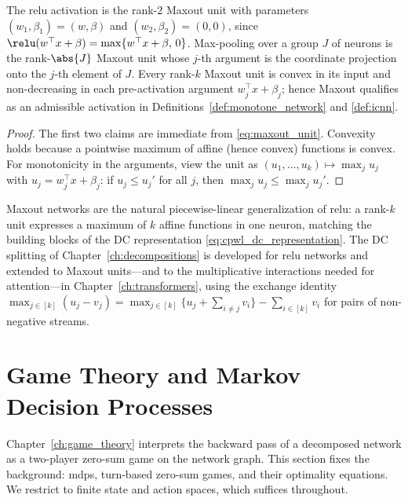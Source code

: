 \begin{observation}\label{obs:relu_maxout_special_case}
The \ac{relu} activation is the rank-$2$ Maxout unit with parameters $(w_1, \beta_1) = (w, \beta)$ and $(w_2, \beta_2) = (0, 0)$, since $\relu(w^\top x + \beta) = \max\{w^\top x + \beta,\, 0\}$. Max-pooling over a group $J$ of neurons is the rank-$\abs{J}$ Maxout unit whose $j$-th argument is the coordinate projection onto the $j$-th element of $J$. Every rank-$k$ Maxout unit is convex in its input and non-decreasing in each pre-activation argument $w_j^\top x + \beta_j$; hence Maxout qualifies as an admissible activation in Definitions~\ref{def:monotone_network} and \ref{def:icnn}.
\hfill{}
\end{observation}

\begin{proof}
The first two claims are immediate from \eqref{eq:maxout_unit}. Convexity holds because a pointwise maximum of affine (hence convex) functions is convex. For monotonicity in the arguments, view the unit as $(u_1, \ldots, u_k) \mapsto \max_j u_j$ with $u_j = w_j^\top x + \beta_j$: if $u_j \le u_j'$ for all $j$, then $\max_j u_j \le \max_j u_j'$.
\end{proof}

\begin{remark}\label{rem:maxout_role}
Maxout networks are the natural piecewise-linear generalization of \ac{relu}: a rank-$k$ unit expresses a maximum of $k$ affine functions in one neuron, matching the building blocks of the DC representation \eqref{eq:cpwl_dc_representation}. The DC splitting of Chapter~\ref{ch:decompositions} is developed for \ac{relu} networks and extended to Maxout units---and to the multiplicative interactions needed for attention---in Chapter~\ref{ch:transformers}, using the exchange identity $\max_{j \in [k]}(u_j - v_j) = \max_{j \in [k]}\bigl\{ u_j + \sum_{i \ne j} v_i \bigr\} - \sum_{i \in [k]} v_i$ for pairs of non-negative streams.
\end{remark}

\section{Game Theory and Markov Decision Processes}\label{sec:game_theory_mdp_foundations}

Chapter~\ref{ch:game_theory} interprets the backward pass of a decomposed network as a two-player zero-sum game on the network graph. This section fixes the background: \acp{mdp}, turn-based zero-sum games, and their optimality equations. We restrict to finite state and action spaces, which suffices throughout.

